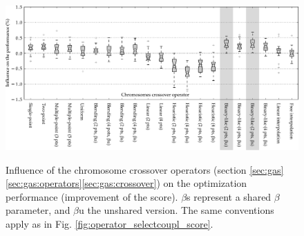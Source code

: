 \documentclass{ametsoc}
\begin{document}
\begin{figure}[t]
	\begin{center}
		\noindent\includegraphics[width=39pc,angle=0]{fig08.pdf}\\
	\end{center}
	\caption{Influence of the chromosome crossover operators (section \ref{sec:gas}\ref{sec:gas:operators}\ref{sec:gas:crossover}) on the optimization performance (improvement of the score).  $\beta$s represent a shared $\beta$ parameter, and $\beta$u the unshared version. The same conventions apply as in Fig. \ref{fig:operator_selectcoupl_score}.}
	\label{fig:operator_crossover_score}
\end{figure}
\end{document}
